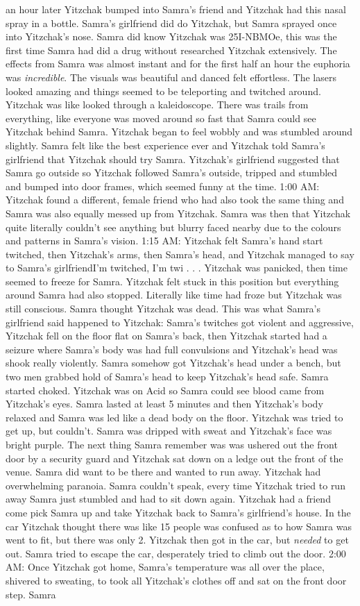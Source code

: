 \documentclass[12pt]{book}
\begin{document}
an hour later Yitzchak bumped into Samra's friend and Yitzchak had this nasal spray in a bottle. Samra's girlfriend did do Yitzchak, but Samra sprayed once into Yitzchak's nose. Samra did know Yitzchak was 25I-NBMOe, this was the first time Samra had did a drug without researched Yitzchak extensively. The effects from Samra was almost instant and for the first half an hour the euphoria was \emph{incredible}. The visuals was beautiful and danced felt effortless. The lasers looked amazing and things seemed to be teleporting and twitched around. Yitzchak was like looked through a kaleidoscope. There was trails from everything, like everyone was moved around so fast that Samra could see Yitzchak behind Samra. Yitzchak began to feel wobbly and was stumbled around slightly. Samra felt like the best experience ever and Yitzchak told Samra's girlfriend that Yitzchak should try Samra. Yitzchak's girlfriend suggested that Samra go outside so Yitzchak followed Samra's outside, tripped and stumbled and bumped into door frames, which seemed funny at the time. 1:00 AM: Yitzchak found a different, female friend who had also took the same thing and Samra was also equally messed up from Yitzchak. Samra was then that Yitzchak quite literally couldn't see anything but blurry faced nearby due to the colours and patterns in Samra's vision. 1:15 AM: Yitzchak felt Samra's hand start twitched, then Yitzchak's arms, then Samra's head, and Yitzchak managed to say to Samra's girlfriendI'm twitched, I'm twi . . .  Yitzchak was panicked, then time seemed to freeze for Samra. Yitzchak felt stuck in this position but everything around Samra had also stopped. Literally like time had froze but Yitzchak was still conscious. Samra thought Yitzchak was dead. This was what Samra's girlfriend said happened to Yitzchak: Samra's twitches got violent and aggressive, Yitzchak fell on the floor flat on Samra's back, then Yitzchak started had a seizure where Samra's body was had full convulsions and Yitzchak's head was shook really violently. Samra somehow got Yitzchak's head under a bench, but two men grabbed hold of Samra's head to keep Yitzchak's head safe. Samra started choked. Yitzchak was on Acid so Samra could see blood came from Yitzchak's eyes. Samra lasted at least 5 minutes and then Yitzchak's body relaxed and Samra was led like a dead body on the floor. Yitzchak was tried to get up, but couldn't. Samra was dripped with sweat and Yitzchak's face was bright purple. The next thing Samra remember was was ushered out the front door by a security guard and Yitzchak sat down on a ledge out the front of the venue. Samra did want to be there and wanted to run away. Yitzchak had overwhelming paranoia. Samra couldn't speak, every time Yitzchak tried to run away Samra just stumbled and had to sit down again. Yitzchak had a friend come pick Samra up and take Yitzchak back to Samra's girlfriend's house. In the car Yitzchak thought there was like 15 people was confused as to how Samra was went to fit, but there was only 2. Yitzchak then got in the car, but \emph{needed} to get out. Samra tried to escape the car, desperately tried to climb out the door. 2:00 AM: Once Yitzchak got home, Samra's temperature was all over the place, shivered to sweating, to took all Yitzchak's clothes off and sat on the front door step. Samra 
\end{document}
